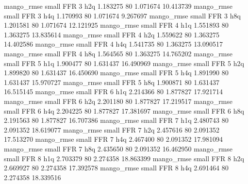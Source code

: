        mango_rmse      small      FFR                 3                  h2q 1.183275 80       1.071674          10.413739
       mango_rmse      small      FFR                 3                  h4q 1.170993 80       1.071674           9.267697
       mango_rmse      small      FFR                 3                  h8q 1.201581 80       1.071674          12.121925
       mango_rmse      small      FFR                 4                  h1q 1.551893 80       1.363275          13.835614
       mango_rmse      small      FFR                 4                  h2q 1.559622 80       1.363275          14.402586
       mango_rmse      small      FFR                 4                  h4q 1.541735 80       1.363275          13.090517
       mango_rmse      small      FFR                 4                  h8q 1.564565 80       1.363275          14.765202
       mango_rmse      small      FFR                 5                  h1q 1.900477 80       1.631437          16.490969
       mango_rmse      small      FFR                 5                  h2q 1.899820 80       1.631437          16.450690
       mango_rmse      small      FFR                 5                  h4q 1.891990 80       1.631437          15.970727
       mango_rmse      small      FFR                 5                  h8q 1.900871 80       1.631437          16.515145
       mango_rmse      small      FFR                 6                  h1q 2.214366 80       1.877827          17.921714
       mango_rmse      small      FFR                 6                  h2q 2.201180 80       1.877827          17.219517
       mango_rmse      small      FFR                 6                  h4q 2.204225 80       1.877827          17.381697
       mango_rmse      small      FFR                 6                  h8q 2.191563 80       1.877827          16.707386
       mango_rmse      small      FFR                 7                  h1q 2.480743 80       2.091352          18.619077
       mango_rmse      small      FFR                 7                  h2q 2.457616 80       2.091352          17.513270
       mango_rmse      small      FFR                 7                  h4q 2.467400 80       2.091352          17.981094
       mango_rmse      small      FFR                 7                  h8q 2.435650 80       2.091352          16.462950
       mango_rmse      small      FFR                 8                  h1q 2.703379 80       2.274358          18.863399
       mango_rmse      small      FFR                 8                  h2q 2.669927 80       2.274358          17.392578
       mango_rmse      small      FFR                 8                  h4q 2.691464 80       2.274358          18.339516
